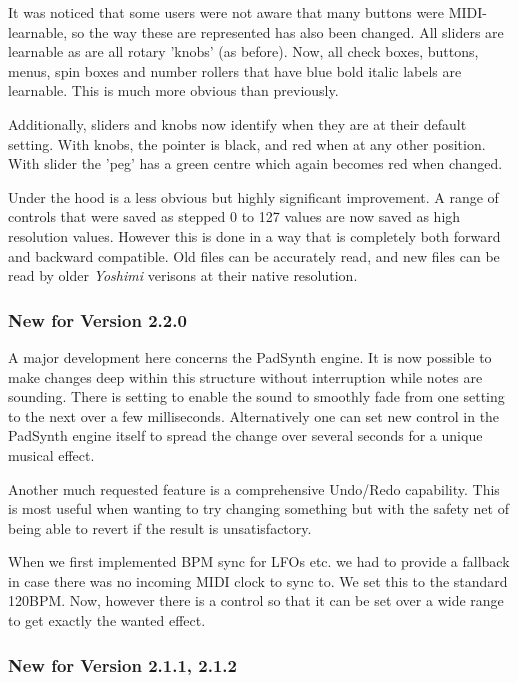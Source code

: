 \documentclass[
 11pt,
 twoside,
 a4paper,
 final                                 %
]{article}
\begin{document}
It was noticed that some users were not aware that many buttons were MIDI-learnable, so the way these are represented has also been changed. All sliders are learnable as are all rotary 'knobs' (as before). Now, all check boxes, buttons, menus, spin boxes and number rollers that have blue bold italic labels are learnable. This is much more obvious than previously.

Additionally, sliders and knobs now identify when they are at their default setting. With knobs, the pointer is black, and red when at any other position. With slider the 'peg' has a green centre which again becomes red when changed.

Under the hood is a less obvious but highly significant improvement. A range of controls that were saved as stepped 0 to 127 values are now saved as high resolution values. However this is done in a way that is completely both forward and backward compatible. Old files can be accurately read, and new files can be read by older \textsl{Yoshimi} verisons at their native resolution.

\subsubsection{New for Version 2.2.0}
\label{subsubsec:new_features_2_2_0}
   A major development here concerns the PadSynth engine. It is now
   possible to make changes deep within this structure without interruption
   while notes are sounding. There is setting to enable the sound to
   smoothly fade from one setting to the next over a few milliseconds.
   Alternatively one can set new control in the PadSynth engine itself to
   spread the change over several seconds for a unique musical effect.

   Another much requested feature is a comprehensive Undo/Redo capability.
   This is most useful when wanting to try changing something but with the
   safety net of being able to revert if the result is unsatisfactory.

   When we first implemented BPM sync for LFOs etc. we had to provide a
   fallback in case there was no incoming MIDI clock to sync to. We set
   this to the standard 120BPM. Now, however there is a control so that it
   can be set over a wide range to get exactly the wanted effect.

\subsubsection{New for Version 2.1.1, 2.1.2}
\label{subsubsec:new_features_2_1_1}
\end{document}
